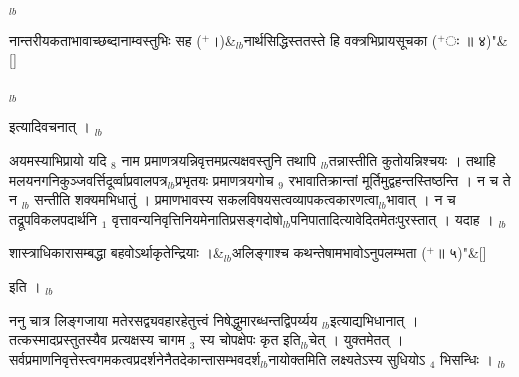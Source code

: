 \documentclass[article,12pt,a4paper]{memoir}%
\newcommand{\add}[1]{($^{+}$#1)}
\newcounter{parCount}
\begin{document}
	{}
	\pend%
      {\tiny $_{lb}$}
	  \bigskip
	  \begingroup
	
	    
	    \stanza[\smallbreak]
	  नान्तरीयकताभावाच्छब्दानाम्वस्तुभिः सह \add{।}&{\tiny $_{lb}$}नार्थसिद्धिस्ततस्ते हि वक्त्रभिप्रायसूचका \add{ः ॥ ४}{\normalfontlatin\large\qquad{}"}\&[\smallbreak]
	  
	  
	  
	  \endgroup
	{\tiny $_{lb}$}

	  
	  \pstart \leavevmode%
	इत्यादिवचनात् ।
	{}
	\pend%
      {\tiny $_{lb}$}

	  
	  \pstart \leavevmode%
	अयमस्याभिप्रायो यदि {\tiny $_{8}$} नाम प्रमाणत्रयन्निवृत्तमप्रत्यक्षवस्तुनि तथापि {\tiny $_{lb}$}तन्नास्तीति कुतोयन्निश्चयः । तथाहि मलयनगनिकुञ्जवर्त्तिदूर्व्वाप्रवालपत्र{\tiny $_{lb}$}प्रभृतयः प्रमाणत्रयगोच {\tiny $_{9}$}\leavevmode{} रभावातिक्रान्तां मूर्तिमुद्वहन्तस्तिष्ठन्ति । न च ते न {\tiny $_{lb}$} \leavevmode{} सन्तीति शक्यमभिधातुं । प्रमाणभावस्य सकलविषयसत्वव्यापकत्वकारणत्वा{\tiny $_{lb}$}भावात् । न च तद्रूपविकलपदार्थनि {\tiny $_{1}$} वृत्तावन्यनिवृत्तिनियमेनातिप्रसङ्गदोषो{\tiny $_{lb}$}पनिपातादित्यावेदितमेतःपुरस्तात् । यदाह । {\tiny $_{lb}$} 
	    \pend%
	  
	    
	    \stanza[\smallbreak]
	  शास्त्राधिकारासम्बद्धा बहवोऽर्थाकृतेन्द्रियाः ।&{\tiny $_{lb}$}अलिङ्गाश्च कथन्तेषामभावोऽनुपलम्भता \add{॥ ५}{\normalfontlatin\large\qquad{}"}\&[\smallbreak]
	  
	  
	  
	    \pstart  \leavevmode%
	    \hphantom{.}
	   इति ।
	{}
	\pend%
      {\tiny $_{lb}$}

	  
	  \pstart \leavevmode%
	ननु चात्र लिङ्गजाया मतेरसद्व्यवहारहेतुत्त्वं निषेद्धुमारब्धन्तद्विपर्य्यय {\tiny $_{lb}$}इत्याद्यभिधानात् । तत्कस्मादप्रस्तुतस्यैव प्रत्यक्षस्य चागम {\tiny $_{3}$} स्य चोपक्षेपः कृत इति{\tiny $_{lb}$}चेत् । युक्तमेतत् । सर्वप्रमाणनिवृत्तेस्त्वगमकत्वप्रदर्शनेनैतदेकान्तासम्भवदर्श{\tiny $_{lb}$}नायोक्तमिति लक्ष्यतेऽस्य सुधियोऽ {\tiny $_{4}$} भिसन्धिः ।
	{}
	\pend%
      {\tiny $_{lb}$}
\end{document}
